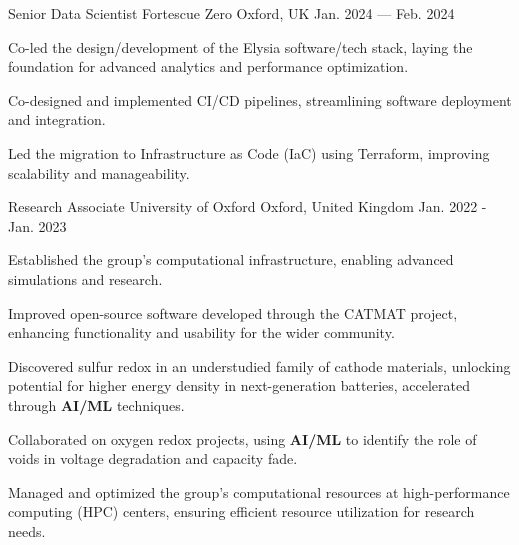 \begin{cventries}
  \cventry
  {Senior Data Scientist } %
  {Fortescue {\color{awesome-nephritis} Zero} } %
  {Oxford, UK} %
  {Jan. 2024 --- Feb. 2024} %
  {
    \begin{cvitems} %
    \item {Co-led the design/development of the Elysia software/tech stack, laying the foundation for advanced analytics and performance optimization.}
    \item {Co-designed and implemented CI/CD pipelines, streamlining software deployment and integration.}
    \item {Led the migration to Infrastructure as Code (IaC) using Terraform, improving scalability and manageability.}
    \end{cvitems}
  }

  \cventry
  {Research Associate } %
  {University of Oxford } %
  {Oxford, United Kingdom} %
  {Jan. 2022 - Jan. 2023} %
  {
    \begin{cvitems} %
    \item {Established the group’s computational infrastructure, enabling advanced simulations and research.}
    \item {Improved open-source software developed through the CATMAT project, enhancing functionality and usability for the wider community.}
    \item {Discovered sulfur redox in an understudied family of cathode materials, unlocking potential for higher energy density in next-generation batteries, accelerated through \textbf{AI/ML} techniques.}
    \item {Collaborated on oxygen redox projects, using \textbf{AI/ML} to identify the role of voids in voltage degradation and capacity fade.}
    \item {Managed and optimized the group’s computational resources at high-performance computing (HPC) centers, ensuring efficient resource utilization for research needs.}
    \end{cvitems}
  }


\end{cventries}

